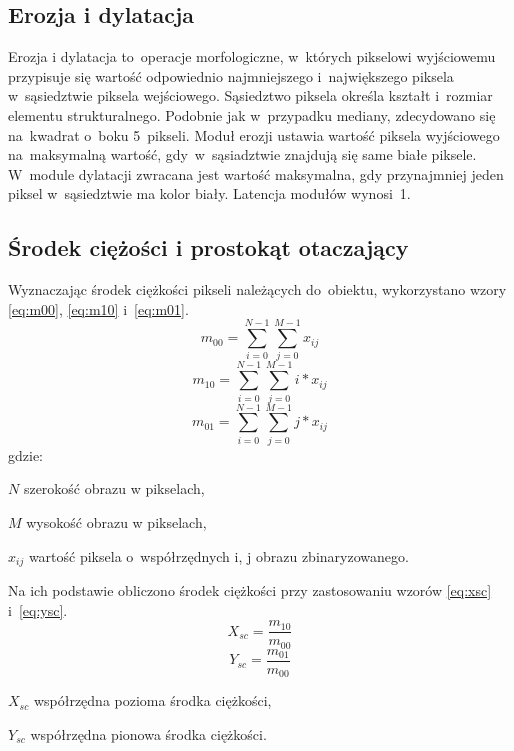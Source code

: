 \subsection{Erozja i dylatacja}
\label{subsec:Erozja}
Erozja i dylatacja to~operacje morfologiczne, w~których pikselowi wyjściowemu przypisuje się wartość odpowiednio najmniejszego i~największego piksela w~sąsiedztwie piksela wejściowego. Sąsiedztwo piksela określa kształt i~rozmiar elementu strukturalnego. Podobnie jak w~przypadku mediany, zdecydowano się na~kwadrat o~boku 5~pikseli. Moduł erozji ustawia wartość piksela wyjściowego na~maksymalną wartość, gdy~w~sąsiadztwie znajdują się same białe piksele. W~module dylatacji zwracana jest wartość maksymalna, gdy przynajmniej jeden piksel w~sąsiedztwie ma kolor biały. Latencja modułów wynosi~1.
\subsection{Środek ciężości i prostokąt otaczający}
\label{subsec:Środek ciężości}
\noindent Wyznaczając środek ciężkości pikseli należących do~obiektu, wykorzystano wzory \ref{eq:m00}, \ref{eq:m10} i~\ref{eq:m01}.
\begin{equation}
\label{eq:m00}
m_{00}=\sum_{i=0}^{N-1}\sum_{j=0}^{M-1} x_{ij}
\end{equation}
\begin{equation}
\label{eq:m10}
m_{10}=\sum_{i=0}^{N-1}\sum_{j=0}^{M-1} i*x_{ij}
\end{equation}
\begin{equation}
\label{eq:m01}
m_{01}=\sum_{i=0}^{N-1}\sum_{j=0}^{M-1} j*x_{ij}
\end{equation}
gdzie:
\begin{eqwhere}[2cm]
	\item[$N$] szerokość obrazu w pikselach,
	\item[$M$] wysokość obrazu w pikselach,
	\item[$x_{ij}$] wartość piksela o~współrzędnych i, j obrazu zbinaryzowanego.
\end{eqwhere}
Na ich podstawie obliczono środek ciężkości przy zastosowaniu wzorów \ref{eq:xsc} i~\ref{eq:ysc}.
\begin{equation}
\label{eq:xsc}
X_{sc}=\frac{m_{10}}{m_{00}}
\end{equation}
\begin{equation}
\label{eq:ysc}
Y_{sc}=\frac{m_{01}}{m_{00}}
\end{equation}
\begin{eqwhere}[2cm]
	\item[$X_{sc}$] współrzędna pozioma środka ciężkości,
	\item[$Y_{sc}$] współrzędna pionowa środka ciężkości.
\end{eqwhere}
